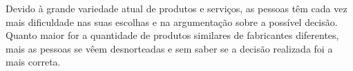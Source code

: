  Devido à grande variedade atual de produtos e serviços, as pessoas têm cada vez mais dificuldade nas suas escolhas e na argumentação sobre a possível decisão. Quanto maior for a quantidade de produtos similares de fabricantes diferentes, mais as pessoas se vêem desnorteadas e sem saber se a decisão realizada foi a mais correta.
 






